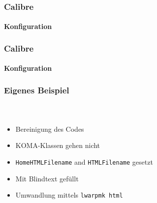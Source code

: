 \documentclass[12pt,ngerman]{beamer}
\begin{document}
\begin{frame}
\frametitle{Calibre}
\framesubtitle{Konfiguration}

\begin{center}
\end{center}

\end{frame}


\begin{frame}
\frametitle{Calibre}
\framesubtitle{Konfiguration}

\begin{center}
\end{center}

\end{frame}



\begin{frame}
\frametitle{Eigenes Beispiel}
\framesubtitle{~}

\begin{itemize}
\item Bereinigung des Codes
\item KOMA-Klassen gehen nicht
\item \texttt{HomeHTMLFilename} and \texttt{HTMLFilename} gesetzt
\item Mit Blindtext gefüllt
\item Umwandlung mittels \texttt{lwarpmk html}
\end{itemize}
\end{frame}
\end{document}
